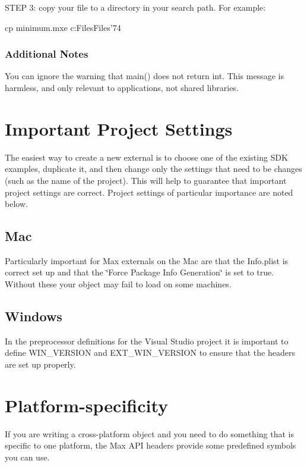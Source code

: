 STEP 3: copy your file to a directory in your search path. For example: 
\begin{DoxyCode}
        cp minimum.mxe c:\Program Files\Common Files\Cycling '74\myexterns\
\end{DoxyCode}
\hypertarget{chapter_platform_chapter_platform_win_cygwin_notes}{}\subsubsection{Additional Notes}\label{chapter_platform_chapter_platform_win_cygwin_notes}
You can ignore the warning that main() does not return int. This message is harmless, and only relevant to applications, not shared libraries.\hypertarget{chapter_platform_chapter_platform_settings}{}\section{Important Project Settings}\label{chapter_platform_chapter_platform_settings}
The easiest way to create a new external is to choose one of the existing SDK examples, duplicate it, and then change only the settings that need to be changes (such as the name of the project). This will help to guarantee that important project settings are correct. Project settings of particular importance are noted below.\hypertarget{chapter_platform_chapter_platform_settings_mac}{}\subsection{Mac}\label{chapter_platform_chapter_platform_settings_mac}
Particularly important for Max externals on the Mac are that the Info.plist is correct set up and that the \char`\"{}Force Package Info Generation\char`\"{} is set to true. Without these your object may fail to load on some machines.\hypertarget{chapter_platform_chapter_platform_settings_win}{}\subsection{Windows}\label{chapter_platform_chapter_platform_settings_win}
In the preprocessor definitions for the Visual Studio project it is important to define WIN\_\-VERSION and EXT\_\-WIN\_\-VERSION to ensure that the headers are set up properly.\hypertarget{chapter_platform_chapter_platform_specificity}{}\section{Platform-\/specificity}\label{chapter_platform_chapter_platform_specificity}
If you are writing a cross-\/platform object and you need to do something that is specific to one platform, the Max API headers provide some predefined symbols you can use.


